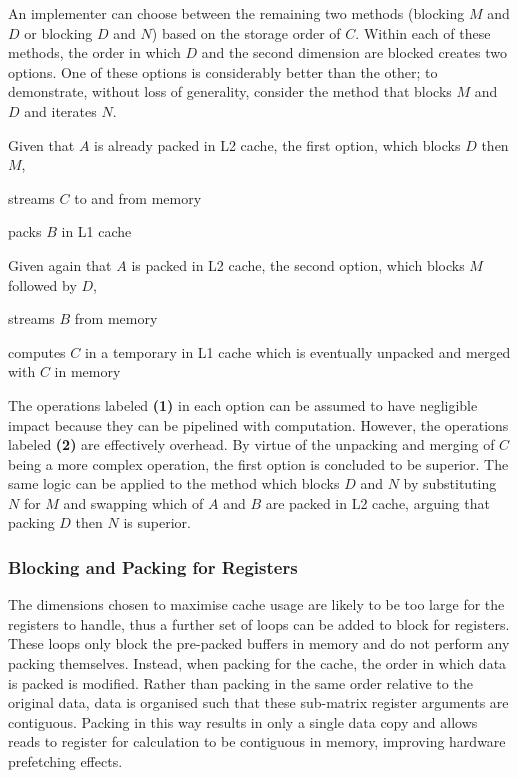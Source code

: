 \documentclass[\main/thesis.tex]{subfiles}
\begin{document}
An implementer can choose between the remaining two methods (blocking $M$ and $D$ or blocking $D$ and $N$) based on the storage order of $C$.
Within each of these methods, the order in which $D$ and the second dimension are blocked creates two options.
One of these options is considerably better than the other; to demonstrate, without loss of generality, consider the method that blocks $M$ and $D$ and iterates $N$.

Given that $A$ is already packed in L2 cache, the first option, which blocks $D$ then $M$,
\begin{enumerate*}[itemjoin*={{ and }}, label=\textbf{(\arabic*)}, after={.}]
  \item streams $C$ to and from memory
  \item packs $B$ in L1 cache
\end{enumerate*}
Given again that $A$ is packed in L2 cache, the second option, which blocks $M$ followed by $D$,
\begin{enumerate*}[itemjoin*={{ and }}, label=\textbf{(\arabic*)}, after={.}]
  \item streams $B$ from memory
  \item computes $C$ in a temporary in L1 cache which is eventually unpacked and merged with $C$ in memory
\end{enumerate*}
The operations labeled \textbf{(1)} in each option can be assumed to have negligible impact because they can be pipelined with computation.
However, the operations labeled \textbf{(2)} are effectively overhead.
By virtue of the unpacking and merging of $C$ being a more complex operation, the first option is concluded to be superior.
The same logic can be applied to the method which blocks $D$ and $N$ by substituting $N$ for $M$ and swapping which of $A$ and $B$ are packed in L2 cache, arguing that packing $D$ then $N$ is superior.

\subsubsection{Blocking and Packing for Registers}
The dimensions chosen to maximise cache usage are likely to be too large for the registers to handle, thus a further set of loops can be added to block for registers.
These loops only block the pre-packed buffers in memory and do not perform any packing themselves.
Instead, when packing for the cache, the order in which data is packed is modified.
Rather than packing in the same order relative to the original data, data is organised such that these sub-matrix register arguments are contiguous.
Packing in this way results in only a single data copy and allows reads to register for calculation to be contiguous in memory, improving hardware prefetching effects.
\end{document}
